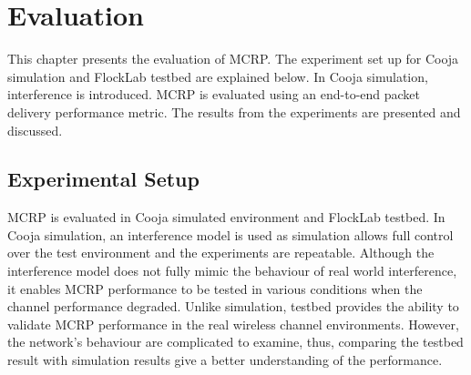 \chapter{Evaluation}
\label{results}


This chapter presents the evaluation of MCRP. The experiment set up for Cooja simulation and FlockLab \cite{flocklab} testbed are explained below. In Cooja simulation, interference is introduced. MCRP is evaluated using an end-to-end packet delivery performance metric. The results from the experiments are presented and discussed. 


\section{Experimental Setup}
MCRP is evaluated in Cooja simulated environment and FlockLab testbed. In Cooja simulation, an interference model is used as simulation allows full control over the test environment and the experiments are repeatable. Although the interference model does not fully mimic the behaviour of real world interference, it enables MCRP performance to be tested in various conditions when the channel performance degraded. Unlike simulation, testbed provides the ability to validate MCRP performance in the real wireless channel environments. However, the network's behaviour are complicated to examine, thus, comparing the testbed result with simulation results give a better understanding of the performance. 


